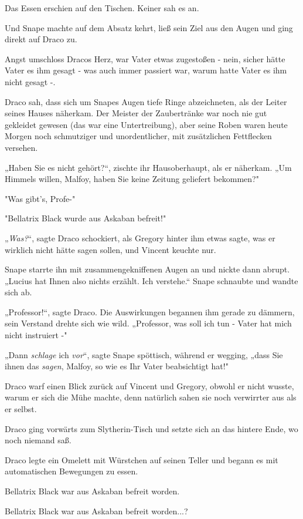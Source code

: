 {Das Essen erschien auf den Tischen. Keiner sah es an.

Und Snape machte auf dem Absatz kehrt, ließ sein Ziel aus den Augen und ging direkt auf Draco zu.

Angst umschloss Dracos Herz, war Vater etwas zugestoßen - nein, sicher hätte Vater es ihm gesagt - was auch immer passiert war, warum hatte Vater es ihm nicht gesagt -.

Draco sah, dass sich um Snapes Augen tiefe Ringe abzeichneten, als der Leiter seines Hauses näherkam. Der Meister der Zaubertränke war noch nie gut gekleidet gewesen (das war eine Untertreibung), aber seine Roben waren heute Morgen noch schmutziger und unordentlicher, mit zusätzlichen Fettflecken versehen.

„Haben Sie es nicht gehört?“, zischte ihr Hausoberhaupt, als er näherkam. „Um Himmels willen, Malfoy, haben Sie keine Zeitung geliefert bekommen?"

"Was gibt's, Profe-"

"Bellatrix Black wurde aus Askaban befreit!"

„\emph{Was?}“, sagte Draco schockiert, als Gregory hinter ihm etwas sagte, was er wirklich nicht hätte sagen sollen, und Vincent keuchte nur.

Snape starrte ihn mit zusammengekniffenen Augen an und nickte dann abrupt. „Lucius hat Ihnen also nichts erzählt. Ich verstehe.“ Snape schnaubte und wandte sich ab.

„Professor!“, sagte Draco. Die Auswirkungen begannen ihm gerade zu dämmern, sein Verstand drehte sich wie wild. „Professor, was soll ich tun - Vater hat mich nicht instruiert -"

„Dann \emph{schlage} ich \emph{vor}“, sagte Snape spöttisch, während er wegging, „dass Sie ihnen das \emph{sagen}, Malfoy, so wie es Ihr Vater beabsichtigt hat!"

Draco warf einen Blick zurück auf Vincent und Gregory, obwohl er nicht wusste, warum er sich die Mühe machte, denn natürlich sahen sie noch verwirrter aus als er selbst.

Draco ging vorwärts zum Slytherin-Tisch und setzte sich an das hintere Ende, wo noch niemand saß.

Draco legte ein Omelett mit Würstchen auf seinen Teller und begann es mit automatischen Bewegungen zu essen.

Bellatrix Black war aus Askaban befreit worden.

Bellatrix Black war aus Askaban befreit worden...?

}
